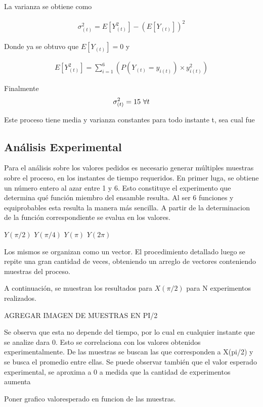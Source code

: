 La varianza se obtiene como

\begin{equation*}
\begin{gathered}
	\sigma^{2}_{(t)} = E\left[Y_{(t)}^{2}\right]- \left(E\left[Y_{(t)}\right]\right)^{2}  
\end{gathered}
\end{equation*}

Donde ya se obtuvo que $E\left[Y_{(t)}\right] = 0$ y 

\begin{equation*}
\begin{gathered}
	E\left[Y_{(t)}^{2}\right] = \sum_{i=1}^{6}\left( P(Y_{(t)} = y_{i(t)}) \times y_{i(t)}^{2}\right) 
\end{gathered}
\end{equation*}

Finalmente
\begin{equation*}
\begin{gathered}
	\sigma^{2}_{(t)} = 15 $   $ \forall t  
\end{gathered}
\end{equation*}

Este proceso tiene media y varianza constantes para todo instante t, sea cual fue


\subsection{Análisis Experimental}

Para el análisis sobre los valores pedidos es necesario generar múltiples muestras sobre el proceso, en los instantes de tiempo requeridos. En primer luga, se obtiene un número entero al azar entre 1 y 6. Esto constituye el experimento que determina qué función miembro del ensamble resulta. Al ser 6 funciones y equiprobables esta resulta la manera más sencilla. A partir de la determinacion de la función correspondiente se evalua en los valores.

\begin{center}
    $Y(\pi/2)$ $Y(\pi/4)$ $Y(\pi)$ $Y(2\pi)$
\end{center}

Los mismos se organizan como un vector. El procedimiento detallado luego se repite una gran cantidad de veces, obteniendo un arreglo de vectores conteniendo muestras del proceso.

A continuación, se muestran los resultados para $X(\pi/2)$ para N experimentos realizados.

AGREGAR IMAGEN DE MUESTRAS EN PI/2




Se observa que esta no depende del tiempo, por lo cual en cualquier instante que se analize dara 0. Esto se correlaciona con los valores obtenidos experimentalmente. De las muestras se buscan las que corresponden a X(pi/2) y se busca el promedio entre ellas. Se puede observar también que el valor esperado experimental, se aproxima a 0 a medida que la cantidad de experimentos aumenta

Poner grafico valoresperado en funcion de las muestras.



